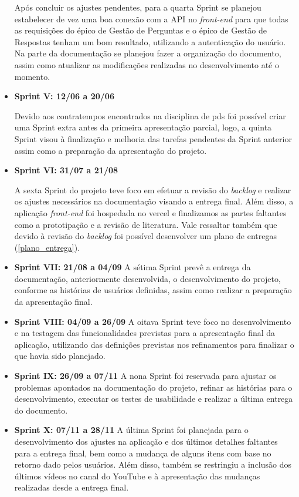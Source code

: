 \begin{itemize}
Após concluir os ajustes pendentes, para a quarta \gls{Sprint} se planejou estabelecer de vez uma boa conexão com a API no \textsl{\gls{front-end}} para que todas as requisições do épico de Gestão de Perguntas e o épico de Gestão de Respostas tenham um bom resultado, utilizando a autenticação do usuário. Na parte da documentação se planejou fazer a organização do documento, assim como atualizar as modificações realizadas no desenvolvimento até o momento. 
\item {\textbf{Sprint V: 12/06 a 20/06}}

Devido aos contratempos encontrados na disciplina de \acs{pds} foi possível criar uma \gls{Sprint} extra antes da primeira apresentação parcial, logo, a quinta \gls{Sprint} visou à finalização e melhoria das tarefas pendentes da \gls{Sprint} anterior assim como a preparação da apresentação do projeto. 
\item \textbf{{Sprint VI: 31/07 a 21/08}}

A sexta \gls{Sprint} do projeto teve foco em efetuar a revisão do \textit{backlog} e realizar os ajustes necessários na documentação visando a entrega final. Além disso, a aplicação \textsl{\gls{front-end}} foi hospedada no \gls{vercel} e finalizamos as partes faltantes como a prototipação e a revisão de literatura. Vale ressaltar também que devido à revisão do \textit{backlog} foi possível desenvolver um plano de entregas (\autoref{plano_entrega}).
\item \textbf{{Sprint VII: 21/08 a 04/09}}
A sétima \gls{Sprint} prevê a entrega da documentação, anteriormente desenvolvida, o desenvolvimento do projeto, conforme as histórias de usuários definidas, assim como realizar a preparação da apresentação final.

\item \textbf{{Sprint VIII: 04/09 a 26/09}}
A oitava \gls{Sprint} teve foco no desenvolvimento e na testagem das funcionalidades previstas para a apresentação final da aplicação, utilizando das definições previstas nos refinamentos para finalizar o que havia sido planejado. 

\item \textbf{{Sprint IX: 26/09 a 07/11}}
A nona \gls{Sprint} foi reservada para ajustar os problemas apontados na documentação do projeto, refinar as histórias para o desenvolvimento, executar os testes de usabilidade e realizar a última entrega do documento. 

\item \textbf{{Sprint X: 07/11 a 28/11}}
A última \gls{Sprint} foi planejada para o desenvolvimento dos ajustes na aplicação e dos últimos detalhes faltantes para a entrega final, bem como a mudança de alguns itens com base no retorno dado pelos usuários. Além disso, também se restringiu a inclusão dos últimos vídeos no canal do YouTube e à apresentação das mudanças realizadas desde a entrega final. 

\end{itemize}


